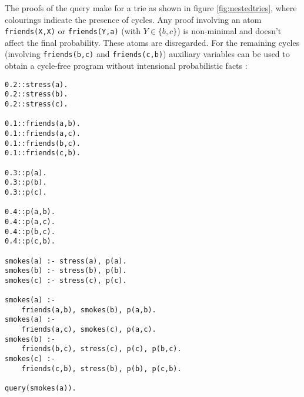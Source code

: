 \begin{figure*}[h]
\begin{tikzpicture}[scale=0.85]
\end{tikzpicture}
\caption{SLG-tree produced while turning the ground program into a boolean formula. Coloured atoms indicate the presence of cycles.}
\label{fig:nestedtries}
\end{figure*}

\noindent The proofs of the query make for a trie as shown in figure \ref{fig:nestedtries}, where colourings indicate the presence of cycles. Any proof involving an atom \texttt{friends(X,X)} or \texttt{friends(Y,a)} (with $Y\in\{b,c\}$) is non-minimal and doesn't affect the final probability. These atoms are disregarded. For the remaining cycles (involving \texttt{friends(b,c)} and \texttt{friends(c,b)}) auxiliary variables can be used to obtain a cycle-free program without intensional probabilistic facts :

\begin{code}
\begin{verbatim}
0.2::stress(a).
0.2::stress(b).
0.2::stress(c).

0.1::friends(a,b).
0.1::friends(a,c).
0.1::friends(b,c).
0.1::friends(c,b).

0.3::p(a).
0.3::p(b).
0.3::p(c).

0.4::p(a,b).
0.4::p(a,c).
0.4::p(b,c).
0.4::p(c,b).

smokes(a) :- stress(a), p(a).
smokes(b) :- stress(b), p(b).
smokes(c) :- stress(c), p(c).

smokes(a) :- 
    friends(a,b), smokes(b), p(a,b).
smokes(a) :-
    friends(a,c), smokes(c), p(a,c).
smokes(b) :- 
    friends(b,c), stress(c), p(c), p(b,c).
smokes(c) :- 
    friends(c,b), stress(b), p(b), p(c,b).

query(smokes(a)).
\end{verbatim}
\label{code:base}
\vspace{0.5cm}
\end{code}


